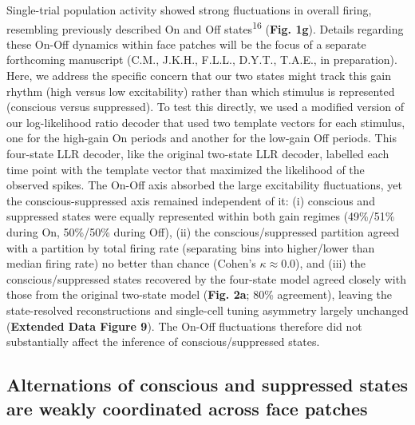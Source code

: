 \documentclass{article}
\begin{document}
Single-trial population activity showed strong fluctuations in overall firing, resembling previously described On and Off states\textsuperscript{16} (\textbf{Fig. 1g}). Details regarding these On-Off dynamics within face patches will be the focus of a separate forthcoming manuscript (C.M., J.K.H., F.L.L., D.Y.T., T.A.E., in preparation). Here, we address the specific concern that our two states might track this gain rhythm (high versus low excitability) rather than which stimulus is represented (conscious versus suppressed). To test this directly, we used a modified version of our log-likelihood ratio decoder that used two template vectors for each stimulus, one for the high-gain On periods and another for the low-gain Off periods. This four-state LLR decoder, like the original two-state LLR decoder, labelled each time point with the template vector that maximized the likelihood of the observed spikes. The On-Off axis absorbed the large excitability fluctuations, yet the conscious-suppressed axis remained independent of it: (i) conscious and suppressed states were equally represented within both gain regimes (49\%/51\% during On, 50\%/50\% during Off), (ii) the conscious/suppressed partition agreed with a partition by total firing rate (separating bins into higher/lower than median firing rate) no better than chance (Cohen's $\kappa \approx 0.0$), and (iii) the conscious/suppressed states recovered by the four-state model agreed closely with those from the original two-state model (\textbf{Fig. 2a}; 80\% agreement), leaving the state-resolved reconstructions and single-cell tuning asymmetry largely unchanged (\textbf{Extended Data Figure 9}). The On-Off fluctuations therefore did not substantially affect the inference of conscious/suppressed states.

\subsection*{Alternations of conscious and suppressed states are weakly coordinated across face patches}
\end{document}
